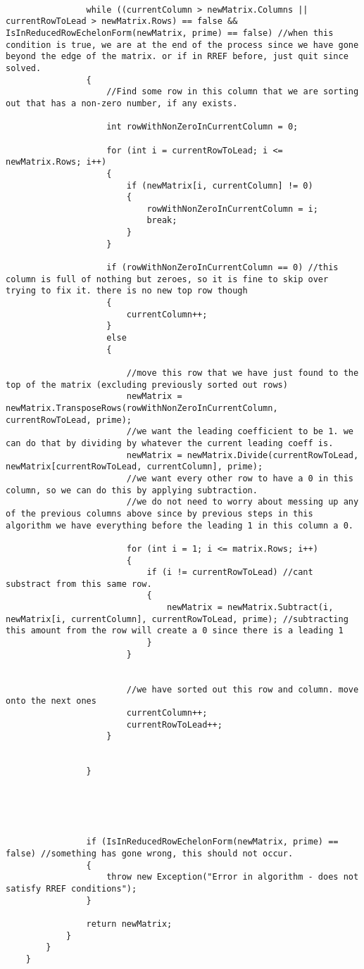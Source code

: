 \documentclass{article}
\begin{document}
\begin{lstlisting}
				
				while ((currentColumn > newMatrix.Columns || currentRowToLead > newMatrix.Rows) == false && IsInReducedRowEchelonForm(newMatrix, prime) == false) //when this condition is true, we are at the end of the process since we have gone beyond the edge of the matrix. or if in RREF before, just quit since solved.
				{
					//Find some row in this column that we are sorting out that has a non-zero number, if any exists.
					
					int rowWithNonZeroInCurrentColumn = 0;
					
					for (int i = currentRowToLead; i <= newMatrix.Rows; i++)
					{
						if (newMatrix[i, currentColumn] != 0)
						{
							rowWithNonZeroInCurrentColumn = i;
							break;
						}
					}
					
					if (rowWithNonZeroInCurrentColumn == 0) //this column is full of nothing but zeroes, so it is fine to skip over trying to fix it. there is no new top row though
					{
						currentColumn++;
					}
					else
					{
						
						//move this row that we have just found to the top of the matrix (excluding previously sorted out rows)
						newMatrix = newMatrix.TransposeRows(rowWithNonZeroInCurrentColumn, currentRowToLead, prime);
						//we want the leading coefficient to be 1. we can do that by dividing by whatever the current leading coeff is.
						newMatrix = newMatrix.Divide(currentRowToLead, newMatrix[currentRowToLead, currentColumn], prime);
						//we want every other row to have a 0 in this column, so we can do this by applying subtraction.
						//we do not need to worry about messing up any of the previous columns above since by previous steps in this algorithm we have everything before the leading 1 in this column a 0.
						
						for (int i = 1; i <= matrix.Rows; i++)
						{
							if (i != currentRowToLead) //cant substract from this same row.
							{
								newMatrix = newMatrix.Subtract(i, newMatrix[i, currentColumn], currentRowToLead, prime); //subtracting this amount from the row will create a 0 since there is a leading 1
							}
						}
						
						
						//we have sorted out this row and column. move onto the next ones
						currentColumn++;
						currentRowToLead++;
					}
					
					
				}
				
				
				
				
				
				if (IsInReducedRowEchelonForm(newMatrix, prime) == false) //something has gone wrong, this should not occur.
				{
					throw new Exception("Error in algorithm - does not satisfy RREF conditions");
				}
				
				return newMatrix;
			}
		}
	}
	
\end{lstlisting}
\end{document}
